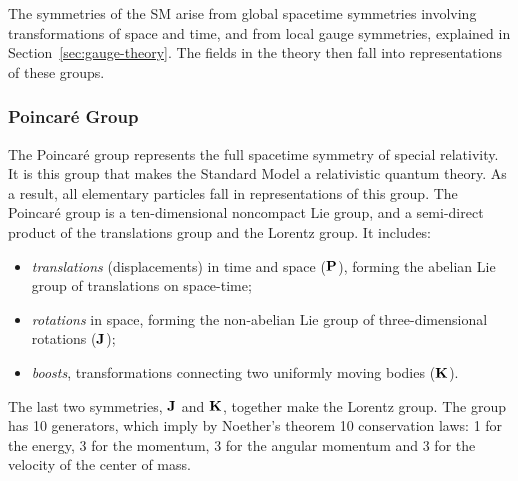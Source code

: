 The symmetries of the SM arise from  global spacetime symmetries involving transformations of space and time, and from local gauge symmetries, explained in Section~\ref{sec:gauge-theory}. The fields in the theory then fall into representations of these groups.

\subsubsection{Poincaré Group}

The Poincaré group represents the full spacetime symmetry of special relativity. It is this group that makes the Standard Model a relativistic quantum theory. As a result, all elementary particles fall in representations of this group. The Poincaré group is a ten-dimensional noncompact Lie group, and a semi-direct product of the translations group and the Lorentz group. It includes:
\begin{itemize}
\item \emph{translations} (displacements) in time and space ($\vb{P}$), forming the abelian Lie group of translations on space-time;
\item \emph{rotations} in space, forming the non-abelian Lie group of three-dimensional rotations ($\vb{J}$);
\item \emph{boosts}, transformations connecting two uniformly moving bodies ($\vb{K}$).
\end{itemize}
The last two symmetries, $\vb{J}$ and $\vb{K}$, together make the Lorentz group. The group has 10 generators, which imply by Noether's theorem 10 conservation laws: 1 for the energy, 3 for the momentum, 3 for the angular momentum and 3 for the velocity of the center of mass.

